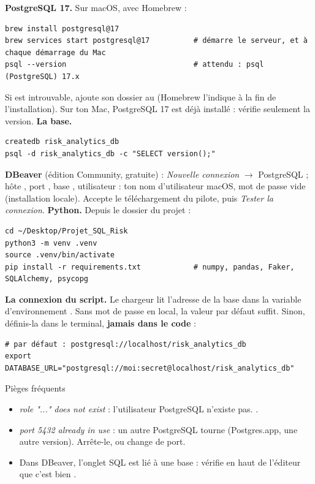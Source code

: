 \begin{itemize}[label={}, leftmargin=1.2em]
\tache \textbf{PostgreSQL 17.} Sur macOS, avec Homebrew :
\begin{lstlisting}[style=shell]
brew install postgresql@17
brew services start postgresql@17          # démarre le serveur, et à chaque démarrage du Mac
psql --version                             # attendu : psql (PostgreSQL) 17.x
\end{lstlisting}
Si  est introuvable, ajoute son dossier au  (Homebrew l'indique à la fin de
l'installation). Sur ton Mac, PostgreSQL 17 est déjà installé : vérifie seulement la version.
\tache \textbf{La base.}
\begin{lstlisting}[style=shell]
createdb risk_analytics_db
psql -d risk_analytics_db -c "SELECT version();"
\end{lstlisting}
\tache \textbf{DBeaver} (édition Community, gratuite) : \emph{Nouvelle connexion} $\rightarrow$
PostgreSQL ; hôte , port , base , utilisateur : ton nom
d'utilisateur macOS, mot de passe vide (installation locale). Accepte le téléchargement du pilote, puis
\emph{Tester la connexion}.
\tache \textbf{Python.} Depuis le dossier du projet :
\begin{lstlisting}[style=shell]
cd ~/Desktop/Projet_SQL_Risk
python3 -m venv .venv
source .venv/bin/activate
pip install -r requirements.txt            # numpy, pandas, Faker, SQLAlchemy, psycopg
\end{lstlisting}
\tache \textbf{La connexion du script.} Le chargeur lit l'adresse de la base dans la variable
d'environnement . Sans mot de passe en local, la valeur par défaut suffit. Sinon,
définis-la dans le terminal, \textbf{jamais dans le code} :
\begin{lstlisting}[style=shell]
# par défaut : postgresql://localhost/risk_analytics_db
export DATABASE_URL="postgresql://moi:secret@localhost/risk_analytics_db"
\end{lstlisting}
\end{itemize}

\begin{piege}{Pièges fréquents}
\begin{itemize}
\item \emph{role "..." does not exist} : l'utilisateur PostgreSQL n'existe pas. .
\item \emph{port 5432 already in use} : un autre PostgreSQL tourne (Postgres.app, une autre version).
Arrête-le, ou change de port.
\item Dans DBeaver, l'onglet SQL est lié à une base : vérifie en haut de l'éditeur que c'est bien
.
\end{itemize}
\end{piege}

